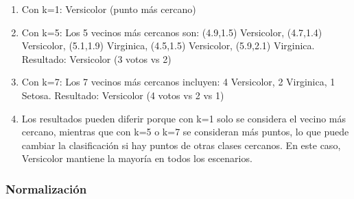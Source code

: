 \documentclass[12pt]{article}
\begin{document}
\begin{enumerate}
    \item Con k=1: Versicolor (punto más cercano)
    \item Con k=5: Los 5 vecinos más cercanos son: (4.9,1.5) Versicolor, (4.7,1.4) Versicolor, (5.1,1.9) Virginica, (4.5,1.5) Versicolor, (5.9,2.1) Virginica. Resultado: Versicolor (3 votos vs 2)
    \item Con k=7: Los 7 vecinos más cercanos incluyen: 4 Versicolor, 2 Virginica, 1 Setosa. Resultado: Versicolor (4 votos vs 2 vs 1)
    \item Los resultados pueden diferir porque con k=1 solo se considera el vecino más cercano, mientras que con k=5 o k=7 se consideran más puntos, lo que puede cambiar la clasificación si hay puntos de otras clases cercanos. En este caso, Versicolor mantiene la mayoría en todos los escenarios.
\end{enumerate}

\subsubsection{Normalización}
\end{document}
